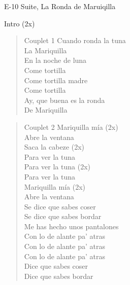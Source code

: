 \begin{song}[vals]{E-10 Suite, La Ronda de Maruiqilla}
\begin{instrumental}{Intro (2x)}
        \measure{}   
\end{instrumental}

\begin{verse}{Couplet 1}
\chord{}Cuando ronda la tuna\\
La Mariquilla\\
\chord{}En la noche de luna\\
Come tortilla\\
\chord{}Come tortilla madre\\
Come tortilla\\
\chord{}Ay, que buena es la ronda\\
De Mariquilla\\
\end{verse}

\begin{verse}{Couplet 2}
\chord{}Mariquilla mía (2x)\\
Abre la ventana\\
\chord{}Saca la cabeze (2x) \\
Para ver la tuna\\
\chord{}Para ver la tuna (2x)\\
Para ver la tuna\\
\chord{}Mariquilla mía (2x)\\
Abre la ventana\\
\chord{}Se dice que sabes coser \hspace{1em} \\
\chord{}Se dice que sabes bordar \hspace{1em} \\
\chord{}Me has hecho unos pantalones\\
Con lo de alante pa' atras\\
\chord{}Con lo de alante pa' atras\hspace{1em} \\
\chord{}Con lo de alante pa' atras\hspace{1em} \\
\chord{}Dice que sabes coser\\
Dice que sabes bordar\\
\end{verse}


\end{song}
